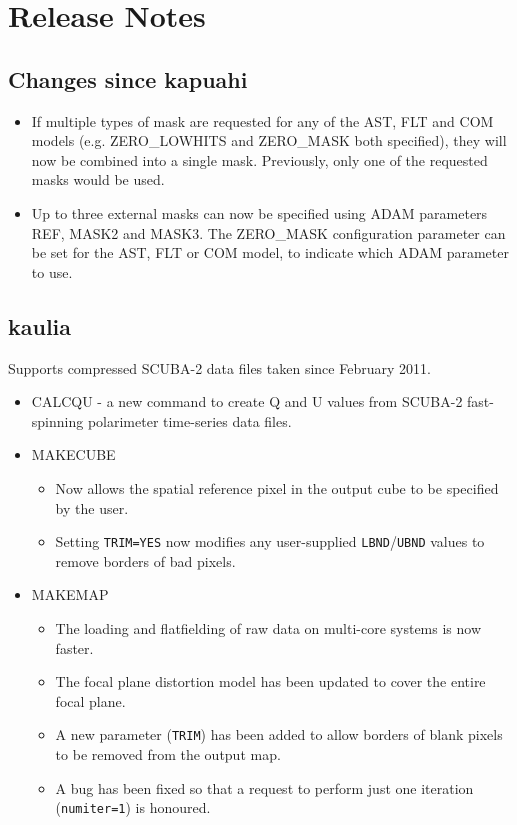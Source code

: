 \documentclass[oneside,11pt]{starlink}
\begin{document}
\section{Release Notes}

\subsection{Changes since kapuahi}

\begin{itemize}
\item If multiple types of mask are requested for any of the AST, FLT
and COM models (e.g. ZERO\_LOWHITS and ZERO\_MASK both specified),
they will now be combined into a single mask. Previously, only one
of the requested masks would be used.
\item Up to three external masks can now be specified using ADAM parameters
REF, MASK2 and MASK3. The ZERO\_MASK configuration parameter can be set
for the AST, FLT or COM model, to indicate which ADAM parameter to use.
\end{itemize}

\subsection{kaulia}

Supports compressed SCUBA-2 data files taken since February 2011.

\begin{itemize}
\item CALCQU - a new command to create Q and U values from SCUBA-2
  fast-spinning polarimeter time-series data files.
\item MAKECUBE
\begin{itemize}
\item Now allows the spatial reference pixel in the output cube to be
  specified by the user.
\item Setting \texttt{TRIM=YES} now modifies any user-supplied
  \texttt{LBND}/\texttt{UBND} values to remove borders of bad pixels.
\end{itemize}
\item MAKEMAP
\begin{itemize}
\item The loading and flatfielding of raw data on multi-core systems
  is now faster.
\item The focal plane distortion model has been updated to cover the
  entire focal plane.
\item A new parameter (\texttt{TRIM}) has been added to allow borders
  of blank pixels to be removed from the output map.
\item A bug has been fixed so that a request to perform just one
  iteration (\texttt{numiter=1}) is honoured.
\end{itemize}
\end{itemize}
\end{document}
